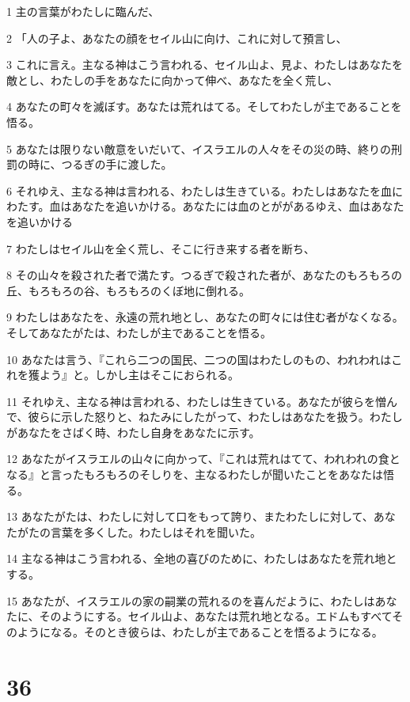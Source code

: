 \par 1 主の言葉がわたしに臨んだ、
\par 2 「人の子よ、あなたの顔をセイル山に向け、これに対して預言し、
\par 3 これに言え。主なる神はこう言われる、セイル山よ、見よ、わたしはあなたを敵とし、わたしの手をあなたに向かって伸べ、あなたを全く荒し、
\par 4 あなたの町々を滅ぼす。あなたは荒れはてる。そしてわたしが主であることを悟る。
\par 5 あなたは限りない敵意をいだいて、イスラエルの人々をその災の時、終りの刑罰の時に、つるぎの手に渡した。
\par 6 それゆえ、主なる神は言われる、わたしは生きている。わたしはあなたを血にわたす。血はあなたを追いかける。あなたには血のとががあるゆえ、血はあなたを追いかける
\par 7 わたしはセイル山を全く荒し、そこに行き来する者を断ち、
\par 8 その山々を殺された者で満たす。つるぎで殺された者が、あなたのもろもろの丘、もろもろの谷、もろもろのくぼ地に倒れる。
\par 9 わたしはあなたを、永遠の荒れ地とし、あなたの町々には住む者がなくなる。そしてあなたがたは、わたしが主であることを悟る。
\par 10 あなたは言う、『これら二つの国民、二つの国はわたしのもの、われわれはこれを獲よう』と。しかし主はそこにおられる。
\par 11 それゆえ、主なる神は言われる、わたしは生きている。あなたが彼らを憎んで、彼らに示した怒りと、ねたみにしたがって、わたしはあなたを扱う。わたしがあなたをさばく時、わたし自身をあなたに示す。
\par 12 あなたがイスラエルの山々に向かって、『これは荒れはてて、われわれの食となる』と言ったもろもろのそしりを、主なるわたしが聞いたことをあなたは悟る。
\par 13 あなたがたは、わたしに対して口をもって誇り、またわたしに対して、あなたがたの言葉を多くした。わたしはそれを聞いた。
\par 14 主なる神はこう言われる、全地の喜びのために、わたしはあなたを荒れ地とする。
\par 15 あなたが、イスラエルの家の嗣業の荒れるのを喜んだように、わたしはあなたに、そのようにする。セイル山よ、あなたは荒れ地となる。エドムもすべてそのようになる。そのとき彼らは、わたしが主であることを悟るようになる。

\chapter{36}

